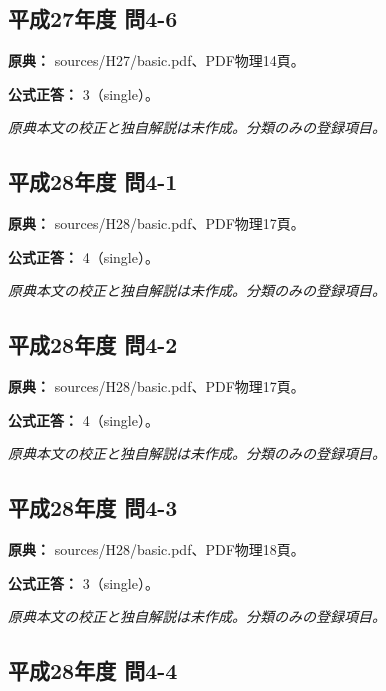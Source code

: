 \subsection{平成27年度 問4-6}
\label{q:h27-reg-basic-4-6}

\noindent\textbf{原典：} sources/H27/basic.pdf、PDF物理14頁。

\textbf{公式正答：} 3（single）。

\par\textit{原典本文の校正と独自解説は未作成。分類のみの登録項目。}

\subsection{平成28年度 問4-1}
\label{q:h28-reg-basic-4-1}

\noindent\textbf{原典：} sources/H28/basic.pdf、PDF物理17頁。

\textbf{公式正答：} 4（single）。

\par\textit{原典本文の校正と独自解説は未作成。分類のみの登録項目。}

\subsection{平成28年度 問4-2}
\label{q:h28-reg-basic-4-2}

\noindent\textbf{原典：} sources/H28/basic.pdf、PDF物理17頁。

\textbf{公式正答：} 4（single）。

\par\textit{原典本文の校正と独自解説は未作成。分類のみの登録項目。}

\subsection{平成28年度 問4-3}
\label{q:h28-reg-basic-4-3}

\noindent\textbf{原典：} sources/H28/basic.pdf、PDF物理18頁。

\textbf{公式正答：} 3（single）。

\par\textit{原典本文の校正と独自解説は未作成。分類のみの登録項目。}

\subsection{平成28年度 問4-4}
\label{q:h28-reg-basic-4-4}

